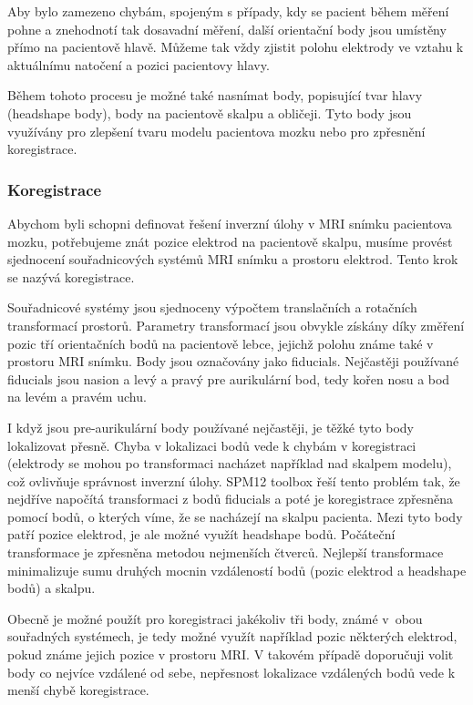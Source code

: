 Aby bylo zamezeno chybám, spojeným s případy, kdy se pacient během měření pohne a znehodnotí tak dosavadní měření, další orientační body jsou umístěny přímo na pacientově hlavě. Můžeme tak vždy zjistit polohu elektrody ve vztahu k aktuálnímu natočení a pozici pacientovy hlavy.

Během tohoto procesu je možné také nasnímat body, popisující tvar hlavy (headshape body), body na pacientově skalpu a obličeji. Tyto body jsou využívány pro zlepšení tvaru modelu pacientova mozku nebo pro zpřesnění koregistrace.

\subsubsection{Koregistrace}
Abychom byli schopni definovat řešení inverzní úlohy v MRI snímku pacientova mozku, potřebujeme znát pozice elektrod na pacientově skalpu, musíme provést sjednocení souřadnicových systémů MRI snímku a prostoru elektrod. Tento krok se nazývá koregistrace.
 
Souřadnicové systémy jsou sjednoceny výpočtem translačních a rotačních transformací prostorů. Parametry transformací jsou obvykle získány díky změření pozic tří orientačních bodů na pacientově lebce, jejichž polohu známe také v prostoru MRI snímku. Body jsou označovány jako fiducials. Nejčastěji používané fiducials jsou nasion a levý a pravý pre aurikulární bod, tedy kořen nosu a bod na levém a pravém uchu. \cite{29}

I když jsou pre-aurikulární body používané nejčastěji, je těžké tyto body lokalizovat přesně. Chyba v lokalizaci bodů vede k chybám v koregistraci (elektrody se mohou po transformaci nacházet například nad skalpem modelu), což ovlivňuje správnost inverzní úlohy. SPM12 toolbox řeší tento problém tak, že nejdříve napočítá transformaci z bodů fiducials a poté je koregistrace zpřesněna pomocí bodů, o kterých víme, že se nacházejí na skalpu pacienta. Mezi tyto body patří pozice elektrod, je ale možné využít headshape bodů. Počáteční transformace je zpřesněna metodou nejmenších čtverců. Nejlepší transformace minimalizuje sumu druhých mocnin vzdáleností bodů (pozic elektrod a headshape bodů) a skalpu.

Obecně je možné použít pro koregistraci jakékoliv tři body, známé v~obou souřadných systémech, je tedy možné využít například pozic některých elektrod, pokud známe jejich pozice v prostoru MRI. V takovém případě doporučuji volit body co nejvíce vzdálené od sebe, nepřesnost lokalizace vzdálených bodů vede k menší chybě koregistrace.


